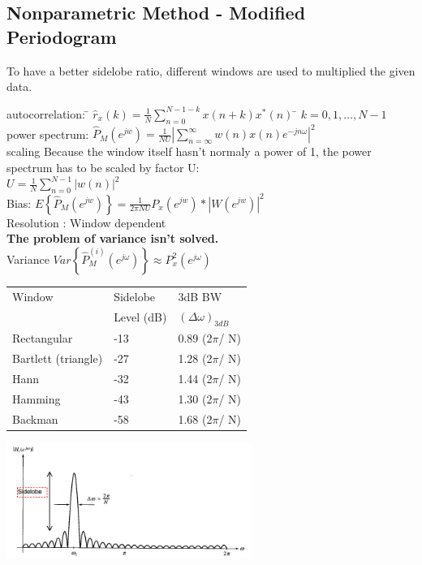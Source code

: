 \subsection{Nonparametric Method - Modified Periodogram }
To have a better sidelobe ratio, different windows are used to multiplied the given data.
\begin{tabbing}
autocorrelation: 	\= $\hat{r}_x(k) =\frac{1}{N} \sum \limits_{n=0}^{N-1-k} x(n+k)x^*(n)$   \hspace{4cm} \= $k=0,1,\ldots,N-1$ \\
power spectrum:  	\>  $\hat{P}_{M}(e^{jw}) = \frac{1}{NU}  \left\lvert \sum\limits_{n=\infty}^{\infty} w(n)x(n)e^{-jn\omega} \right\rvert ^2$   \\
scaling 			\> Because the window itself hasn't normaly a power of 1, the power spectrum has to be scaled by factor U:\\
\>					$U=\frac{1}{N} \sum\limits_{n=0}^{N-1}|w(n)|^2$\\
Bias: 				\>  $E\left\lbrace \hat{P}_{M}(e^{jw}) \right\rbrace = \frac{1}{2 \pi NU}P_x(e^{jw})*|W(e^{jw})|^2$\\
Resolution : 		\>  Window dependent\\
\textbf{The problem of variance isn't solved.}\\
Variance 			\> $Var\left\lbrace \hat{P}_{M}^{(i)}(e^{j\omega}) \right\rbrace \approx P^2_x(e^{j\omega})$\\
\end{tabbing}

\begin{minipage}{10cm}
\begin{tabular}{p{3cm} p{3cm} p{3cm}}
Window	 &  	Sidelobe 	&3dB BW\\
&				Level (dB)	& $(\Delta\omega)_{3dB}$\\
\hline
Rectangular&			-13	&		0.89 (2$\pi$/ N)\\
Bartlett (triangle)&	-27	&		1.28 (2$\pi$/ N)\\
Hann				&	-32	&		1.44 (2$\pi$/ N)\\
Hamming&				-43	&		1.30 (2$\pi$/ N)\\
Backman		&			-58	&		1.68 (2$\pi$/ N)
\end{tabular}
\end{minipage}
\begin{minipage}{8cm}
\includegraphics[width=8cm]{./bilder/sidelobe.jpg}
\end{minipage}



